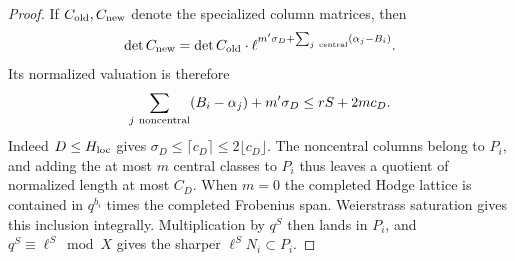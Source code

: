 \begin{proof}
If \(C_{\rm old},C_{\rm new}\) denote the specialized
column matrices, then
\[
 \det C_{\rm new}=\det C_{\rm old}\cdot
       \ell^{m'\sigma_D+\sum_{j\ {\rm central}}(\alpha_j-B_i)}.
\]
Its normalized valuation is therefore
\[
\sum_{j\ {\rm noncentral}}(B_i-\alpha_j)+m'\sigma_D
 \le rS+2mc_D.
\]
Indeed \(D\le H_{\rm loc}\) gives
\(\sigma_D\le\lceil c_D\rceil\le2\lfloor c_D\rfloor\).
The noncentral columns belong to \(P_i\), and adding the
at most \(m\) central classes to \(P_i\) thus leaves a quotient
of normalized length at most \(C_D\).
When \(m=0\) the completed Hodge lattice is contained in
\(q^{b_i}\) times the completed Frobenius span. Weierstrass
saturation gives this inclusion integrally. Multiplication
by \(q^S\) then lands in \(P_i\), and
\(q^S\equiv\ell^S\bmod X\) gives the sharper
\(\ell^S N_i\subset P_i\).
\end{proof}

